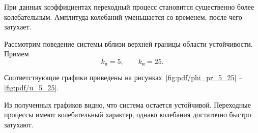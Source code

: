 
При данных коэффициентах переходный процесс становится существенно более колебательным. Амплитуда колебаний уменьшается со временем, после чего затухает.

Рассмотрим поведение системы вблизи верхней границы области устойчивости. Примем
\begin{equation}
k_{\text{п}} = 5,
\qquad
k_{\text{и}} = 25.
\end{equation}

Соответствующие графики приведены на рисунках~\ref{fig:pdf/phi_pr_5_25} -- \ref{fig:pdf/u_5_25}.





Из полученных графиков видно, что система остается устойчивой. Переходные процессы имеют колебательный характер, однако колебания достаточно быстро затухают.
